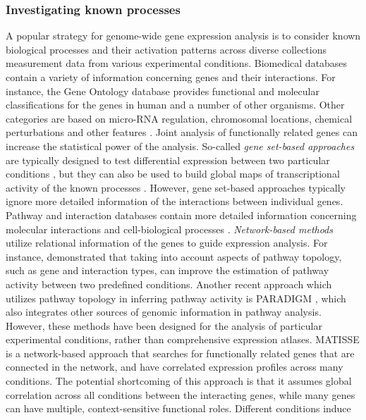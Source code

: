 \subsubsection{Investigating known processes}

A popular strategy for genome-wide gene expression analysis is to
consider known biological processes and their activation patterns
across diverse collections measurement data from various experimental
conditions.  Biomedical databases contain a variety of information
concerning genes and their interactions. For instance, the Gene
Ontology database \citep{Ashburner00} provides functional and
molecular classifications for the genes in human and a number of other
organisms. Other categories are based on micro-RNA regulation,
chromosomal locations, chemical perturbations and other features
\citep{Subramanian05}. Joint analysis of functionally related genes
can increase the statistical power of the analysis.  So-called {\it
  gene set-based approaches} are typically designed to test
differential expression between two particular conditions
\citep{Goeman07, Nam08}, but they can also be used to build global
maps of transcriptional activity of the known processes
\citep{Levine06}. However, gene set-based approaches typically ignore
more detailed information of the interactions between individual
genes. Pathway and interaction databases contain more detailed
information concerning molecular interactions and cell-biological
processes \citep{Kanehisa08, Vastrik07}.  {\it Network-based methods}
utilize relational information of the genes to guide expression
analysis. For instance, \cite{Draghici07} demonstrated that taking
into account aspects of pathway topology, such as gene and interaction
types, can improve the estimation of pathway activity between two
predefined conditions. Another recent approach which utilizes pathway
topology in inferring pathway activity is PARADIGM \citep{Vaske2010},
which also integrates other sources of genomic information in pathway
analysis. However, these methods have been designed for the analysis
of particular experimental conditions, rather than comprehensive
expression atlases. MATISSE \citep{Ulitsky07} is a network-based
approach that searches for functionally related genes that are
connected in the network, and have correlated expression profiles
across many conditions. The potential shortcoming of this approach is
that it assumes global correlation across all conditions between the
interacting genes, while many genes can have multiple,
context-sensitive functional roles.  Different conditions induce
